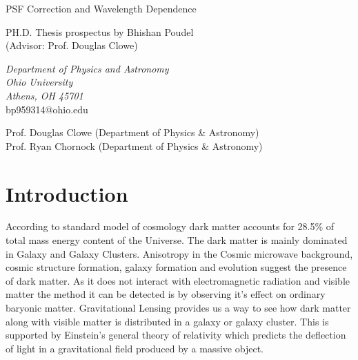 \documentclass[12pt]{article}
\begin{document}
\thispagestyle{empty}

\begin{center}
        {\fontsize{24pt}{32pt}
                PSF Correction and Wavelength Dependence}

        \vspace{3cm}

        {%
                \sc
                PH.D. Thesis prospectus by Bhishan Poudel\\
                (Advisor: Prof. Douglas Clowe)}

        \vspace{2cm}

        {\it
                Department of Physics and Astronomy\\
                Ohio University\\
                Athens, OH 45701\\}
        \vspace{1cm}
        bp959314@ohio.edu
\end{center}

\vfill
\noindent Prof. Douglas Clowe (Department of Physics \& Astronomy)\\
Prof. Ryan Chornock (Department of Physics \& Astronomy)\\

\newpage
\tableofcontents
\clearpage

\section{Introduction}


According to standard model of cosmology dark matter accounts for  28.5\% of total mass energy content of the Universe.  The dark matter is mainly dominated in Galaxy and Galaxy Clusters.  Anisotropy in the Cosmic microwave background, cosmic structure formation,  galaxy formation and evolution suggest the presence of dark matter.  As it does not interact with electromagnetic radiation and visible matter the method it can  be detected is by observing it's effect on ordinary baryonic matter.  Gravitational Lensing provides us a way to see how dark matter along with visible matter is distributed in a galaxy or galaxy cluster.  This is supported by Einstein's general theory of relativity which predicts the deflection of light in a gravitational field produced by a massive object.
\end{document}
